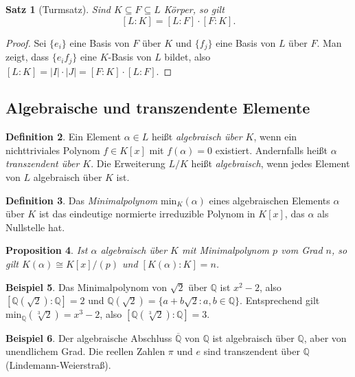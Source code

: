 \documentclass[12pt,a4paper]{amsart}
\newtheorem{theorem}{Satz}[section]
\newtheorem{proposition}[theorem]{Proposition}
\theoremstyle{definition}
\newtheorem{definition}[theorem]{Definition}
\newtheorem{beispiel}[theorem]{Beispiel}
\newcommand{\Q}{\mathbb{Q}}
\begin{document}
\begin{theorem}[Turmsatz]
Sind $K \subseteq F \subseteq L$ Körper, so gilt
\[
  [L:K] = [L:F] \cdot [F:K].
\]
\end{theorem}

\begin{proof}
Sei $\{e_i\}$ eine Basis von $F$ über $K$ und $\{f_j\}$ eine Basis von $L$
über $F$. Man zeigt, dass $\{e_i f_j\}$ eine $K$-Basis von $L$ bildet, also
$[L:K] = |I| \cdot |J| = [F:K] \cdot [L:F]$.
\end{proof}

\subsection{Algebraische und transzendente Elemente}

\begin{definition}
Ein Element $\alpha \in L$ heißt \emph{algebraisch über $K$}, wenn ein
nichttriviales Polynom $f \in K[x]$ mit $f(\alpha) = 0$ existiert. Andernfalls
heißt $\alpha$ \emph{transzendent über $K$}. Die Erweiterung $L/K$ heißt
\emph{algebraisch}, wenn jedes Element von $L$ algebraisch über $K$ ist.
\end{definition}

\begin{definition}
Das \emph{Minimalpolynom} $\mathrm{min}_{K}(\alpha)$ eines algebraischen
Elements $\alpha$ über $K$ ist das eindeutige normierte irreduzible Polynom
in $K[x]$, das $\alpha$ als Nullstelle hat.
\end{definition}

\begin{proposition}
Ist $\alpha$ algebraisch über $K$ mit Minimalpolynom $p$ vom Grad $n$, so gilt
$K(\alpha) \cong K[x]/(p)$ und $[K(\alpha):K] = n$.
\end{proposition}

\begin{beispiel}
Das Minimalpolynom von $\sqrt{2}$ über $\Q$ ist $x^2 - 2$, also
$[\Q(\sqrt{2}):\Q] = 2$ und $\Q(\sqrt{2}) = \{a + b\sqrt{2} : a,b \in \Q\}$.
Entsprechend gilt $\mathrm{min}_\Q(\sqrt[3]{2}) = x^3 - 2$, also
$[\Q(\sqrt[3]{2}):\Q] = 3$.
\end{beispiel}

\begin{beispiel}
Der algebraische Abschluss $\overline{\Q}$ von $\Q$ ist algebraisch über $\Q$,
aber von unendlichem Grad. Die reellen Zahlen $\pi$ und $e$ sind transzendent
über $\Q$ (Lindemann-Weierstraß).
\end{beispiel}
\end{document}
